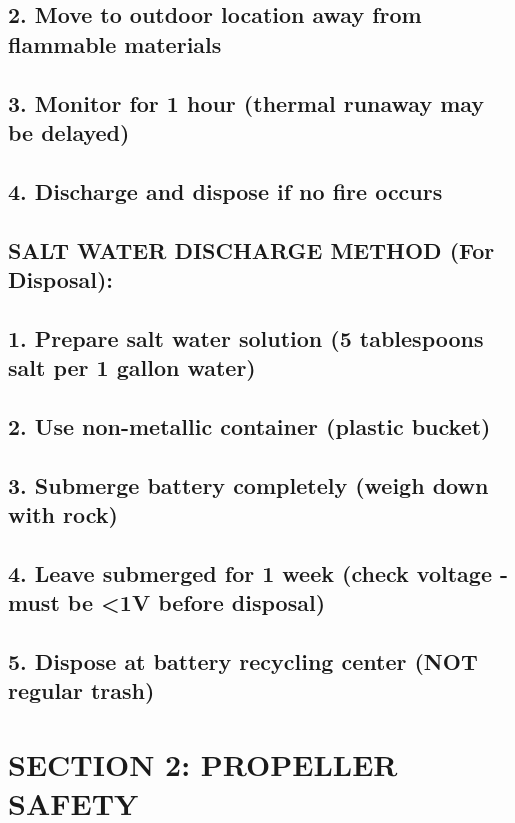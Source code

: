 \documentclass[11pt,letterpaper]{article}
\begin{document}
\subsection*{2. Move to outdoor location away from flammable materials}

\subsection*{3. Monitor for 1 hour (thermal runaway may be delayed)}

\subsection*{4. Discharge and dispose if no fire occurs}

\subsection*{SALT WATER DISCHARGE METHOD (For Disposal):}

\subsection*{1. Prepare salt water solution (5 tablespoons salt per 1 gallon water)}

\subsection*{2. Use non-metallic container (plastic bucket)}

\subsection*{3. Submerge battery completely (weigh down with rock)}

\subsection*{4. Leave submerged for 1 week (check voltage - must be <1V before disposal)}

\subsection*{5. Dispose at battery recycling center (NOT regular trash)}

\section{SECTION 2: PROPELLER SAFETY}
\end{document}
